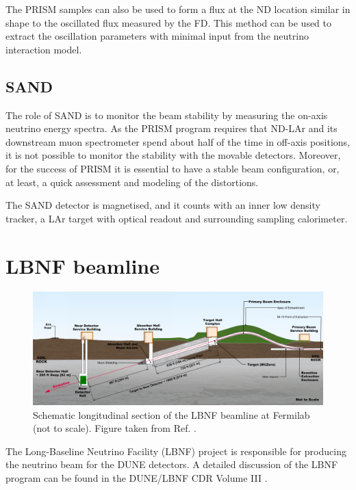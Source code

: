 The PRISM samples can also be used to form a flux at the ND location similar in shape to the oscillated flux measured by the FD. This method can be used to extract the oscillation parameters with minimal input from the neutrino interaction model.

\subsection{SAND}

The role of SAND is to monitor the beam stability by measuring the on-axis neutrino energy spectra. As the PRISM program requires that ND-LAr and its downstream muon spectrometer spend about half of the time in off-axis positions, it is not possible to monitor the stability with the movable detectors. Moreover, for the success of PRISM it is essential to have a stable beam configuration, or, at least, a quick assessment and modeling of the distortions.

The SAND detector is magnetised, and it counts with an inner low density tracker, a LAr target with optical readout and surrounding sampling calorimeter.

\section{LBNF beamline}

\begin{figure}[t]
	\centering
	\includegraphics[width=0.95\linewidth]{Images/DUNE/LBNF/beamline-sideview}
	\caption[Schematic longitudinal section of the LBNF beamline at Fermilab.]{Schematic longitudinal section of the LBNF beamline at Fermilab (not to scale). Figure taken from Ref. \cite{DUNE2016CDR3}.}
	\label{fig:lbnf_beamline}
\end{figure}

The Long-Baseline Neutrino Facility (LBNF) project is responsible for producing the neutrino beam for the DUNE detectors. A detailed discussion of the LBNF program can be found in the DUNE/LBNF CDR Volume III \cite{DUNE2016CDR3}.

